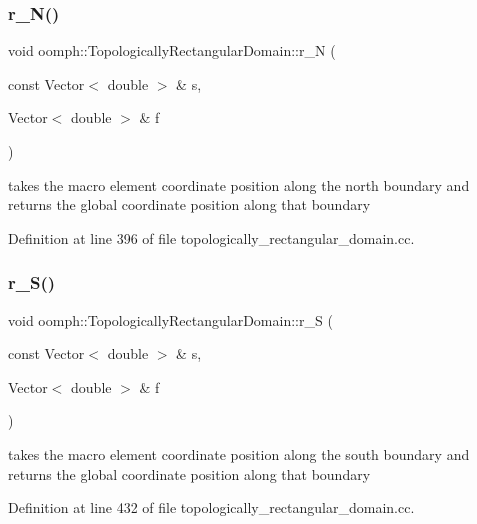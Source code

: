 \subsubsection{\texorpdfstring{r\+\_\+\+N()}{r\_N()}}
{\footnotesize\ttfamily void oomph\+::\+Topologically\+Rectangular\+Domain\+::r\+\_\+N (\begin{DoxyParamCaption}\item[{const Vector$<$ double $>$ \&}]{s,  }\item[{Vector$<$ double $>$ \&}]{f }\end{DoxyParamCaption})\hspace{0.3cm}{\ttfamily [private]}}



takes the macro element coordinate position along the north boundary and returns the global coordinate position along that boundary 



Definition at line 396 of file topologically\+\_\+rectangular\+\_\+domain.\+cc.

\mbox{\label{classoomph_1_1TopologicallyRectangularDomain_a76ea308be7a90143fe728fc4799d584b}} 
\subsubsection{\texorpdfstring{r\+\_\+\+S()}{r\_S()}}
{\footnotesize\ttfamily void oomph\+::\+Topologically\+Rectangular\+Domain\+::r\+\_\+S (\begin{DoxyParamCaption}\item[{const Vector$<$ double $>$ \&}]{s,  }\item[{Vector$<$ double $>$ \&}]{f }\end{DoxyParamCaption})\hspace{0.3cm}{\ttfamily [private]}}



takes the macro element coordinate position along the south boundary and returns the global coordinate position along that boundary 



Definition at line 432 of file topologically\+\_\+rectangular\+\_\+domain.\+cc.

